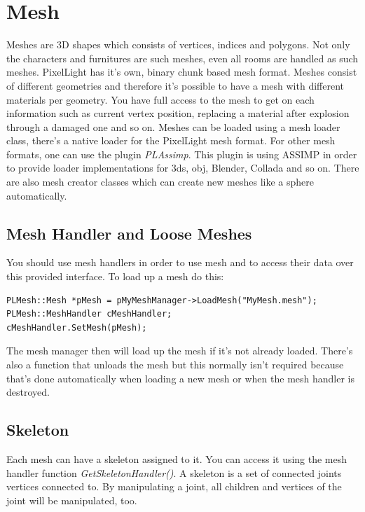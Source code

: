 \section{Mesh}
Meshes are 3D shapes which consists of vertices, indices and polygons. Not only the characters and furnitures are such meshes, even all rooms are handled as such meshes. PixelLight has it's own, binary chunk based mesh format. Meshes consist of different geometries and therefore it's possible to have a mesh with different materials per geometry. You have full access to the mesh to get on each information such as current vertex position, replacing a material after explosion through a damaged one and so on. Meshes can be loaded using a mesh loader class, there's a native loader for the PixelLight mesh format. For other mesh formats, one can use the plugin \emph{PLAssimp}. This plugin is using \ac{ASSIMP} in order to provide loader implementations for 3ds, obj, Blender, Collada and so on. There are also mesh creator classes which can create new meshes like a sphere automatically.




\subsection{Mesh Handler and Loose Meshes}
You should use mesh handlers in order to use mesh and to access their data over this provided interface. To load up a mesh do this:

\begin{lstlisting}[caption=Loading a mesh]
PLMesh::Mesh *pMesh = pMyMeshManager->LoadMesh("MyMesh.mesh");
PLMesh::MeshHandler cMeshHandler;
cMeshHandler.SetMesh(pMesh);
\end{lstlisting}

The mesh manager then will load up the mesh if it's not already loaded. There's also a function that unloads the mesh but this normally isn't required because that's done automatically when loading a new mesh or when the mesh handler is destroyed.




\subsection{Skeleton}
Each mesh can have a skeleton assigned to it. You can access it using the mesh handler function \emph{GetSkeletonHandler()}. A skeleton is a set of connected joints vertices connected to. By manipulating a joint, all children and vertices of the joint will be manipulated, too.

